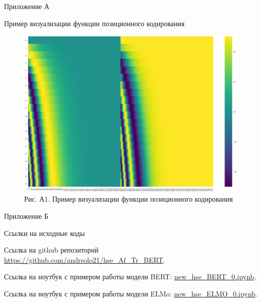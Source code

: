 \documentclass[a4paper,14pt]{article}
\begin{document}
 	
	

\begin{flushright}
	Приложение А
\end{flushright}


\begin{center}
	Пример визуализации функции позиционного кодирования
\end{center}


\begin{figure}[H]
	\centering
	\includegraphics[width=0.95\linewidth]{image/v9dvohtljexbjop_vrykyyqdzbk}
	\caption*{Рис. А1. Пример визуализации функции позиционного кодирования}
	\label{fig:v9dvohtljexbjopvrykyyqdzbk}
\end{figure}

\newpage


\begin{flushright}
	Приложение Б
\end{flushright}

\begin{center}
	Ссылки на исходные коды
\end{center}

Ссылка на github репозиторий \href{https://github.com/andrsolo21/hse_Af_Tr_BERT}{https://github.com/andrsolo21/hse\_Af\_Tr\_BERT}.

Ссылка на ноутбук с примером работы модели BERT: \href{https://github.com/andrsolo21/hse_Af_Tr_BERT/blob/main/new_hse_BERT_0.ipynb}{new\_hse\_BERT\_0.ipynb}.

Ссылка на ноутбук с примером работы модели ELMo:  \href{https://github.com/andrsolo21/hse_Af_Tr_BERT/blob/main/new_hse_ELMO_0.ipynb}{new\_hse\_ELMO\_0.ipynb}.
\end{document}
